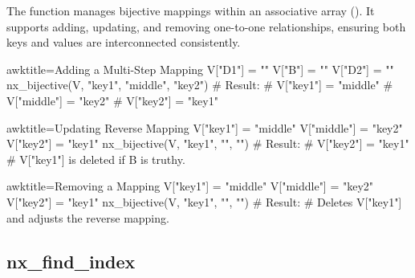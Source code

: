 \begin{NexMainBox}
	\begin{NexMainBox}
		The  function manages bijective mappings within an associative array (). It supports adding, updating, and removing one-to-one relationships, ensuring both keys and values are interconnected consistently.
	\end{NexMainBox}
	\begin{NexMainBox}
		\begin{NexListDark}
		\end{NexListDark}
	\end{NexMainBox}
\end{NexMainBox}

\begin{NexCodeBox}{awk}{title={Adding a Multi-Step Mapping}}
	V["D1"] = ""
	V["B"] = ""
	V["D2"] = ""
	nx_bijective(V, "key1", "middle", "key2")
	# Result:
	# V["key1"] = "middle"
	# V["middle"] = "key2"
	# V["key2"] = "key1"
\end{NexCodeBox}

\begin{NexCodeBox}{awk}{title={Updating Reverse Mapping}}
	V["key1"] = "middle"
	V["middle"] = "key2"
	V["key2"] = "key1"
	nx_bijective(V, "key1", "", "")
	# Result:
	# V["key2"] = "key1"
	# V["key1"] is deleted if B is truthy.
\end{NexCodeBox}

\begin{NexCodeBox}{awk}{title={Removing a Mapping}}
	V["key1"] = "middle"
	V["middle"] = "key2"
	V["key2"] = "key1"
	nx_bijective(V, "key1", "", "")
	# Result:
	# Deletes V["key1"] and adjusts the reverse mapping.
\end{NexCodeBox}

\newpage
\subsection{nx_find_index}
\label{nx_find_index}

